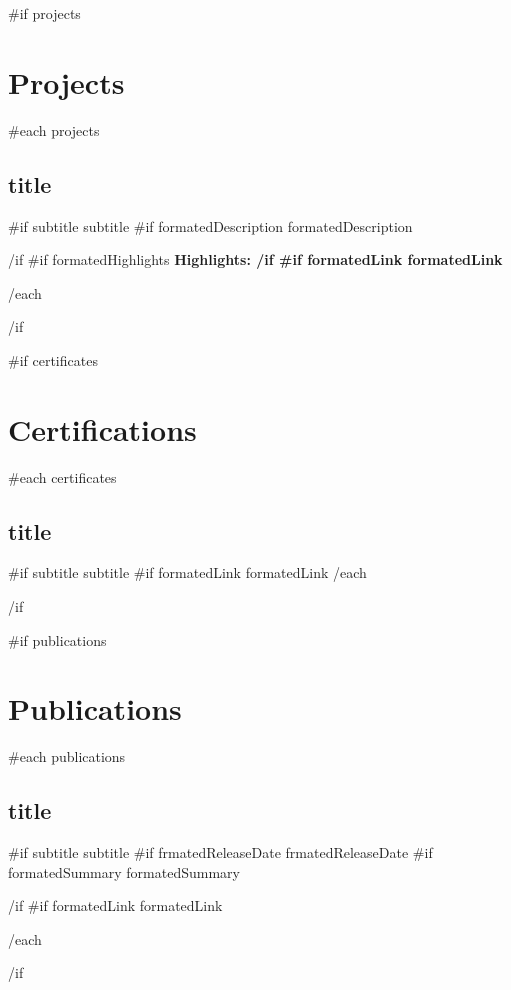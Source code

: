 \documentclass{article}
\begin{document}
{{#if projects}}\section*{Projects}{
  {{#each projects}}
    \subsection*{ {{ title }} } {
      {{#if subtitle}}{{ subtitle }} \ignorespaces
      {{#if formatedDescription}}
        {{ formatedDescription }} 
        \par
      {{/if}}\ignorespaces
      {{#if formatedHighlights}}
        \bfseries Highlights: \newline
      {{/if}}\ignorespaces
      {{#if formatedLink}}{{ formatedLink }} \ignorespaces
    }
  {{/each}}
}{{/if}}

{{#if certificates}}\section*{Certifications}{
  {{#each certificates}}
    \subsection*{ {{ title }} } {
      {{#if subtitle}}{{ subtitle }} \ignorespaces
      {{#if formatedLink}}{{ formatedLink }}\ignorespaces
    }
  {{/each}}
}{{/if}}\ignorespaces

{{#if publications}}\section*{Publications}{
  {{#each publications}}
    \subsection*{ {{ title }} } {
      {{#if subtitle}}{{ subtitle }} \ignorespaces
      {{#if frmatedReleaseDate}}{{ frmatedReleaseDate }} \ignorespaces
      {{#if formatedSummary}}
        {{ formatedSummary }} 
        \par
      {{/if}}\ignorespaces
      {{#if formatedLink}}{{ formatedLink }} \ignorespaces
    }
  {{/each}}
}{{/if}}\ignorespaces
\end{document}
